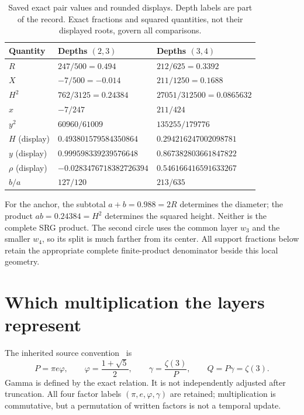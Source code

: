 \documentclass[11pt,a4paper]{article}
\begin{document}
\begin{table}[ht]
\centering\small
\begin{tabular}{@{}lll@{}}
\toprule
Quantity & Depths $(2,3)$ & Depths $(3,4)$\\
\midrule
$R$ & $247/500=0.494$ & $212/625=0.3392$\\
$X$ & $-7/500=-0.014$ & $211/1250=0.1688$\\
$H^2$ & $762/3125=0.24384$ & $27051/312500=0.0865632$\\
$x$ & $-7/247$ & $211/424$\\
$y^2$ & $60960/61009$ & $135255/179776$\\
$H$ (display) & $0.493801579584350864$ & $0.294216247002098781$\\
$y$ (display) & $0.999598339239576648$ & $0.867382803661847822$\\
$\rho$ (display) & $-0.0283476718382726394$ & $0.546166416591633267$\\
$b/a$ & $127/120$ & $213/635$\\
\bottomrule
\end{tabular}
\caption{Saved exact pair values and rounded displays. Depth labels are part of the record. Exact fractions and squared quantities, not their displayed roots, govern all comparisons.}
\label{tab:pair}
\end{table}

For the anchor, the subtotal $a+b=0.988=2R$ determines the diameter; the product $ab=0.24384=H^2$ determines the squared height. Neither is the complete SRG product. The second circle uses the common layer $w_3$ and the smaller $w_4$, so its split is much farther from its center. All support fractions below retain the appropriate complete finite-product denominator beside this local geometry.

\clearpage
\section{Which multiplication the layers represent}
\label{sec:arithmetic}
The inherited source convention~\cite{ph02,multiplication} is
\begin{equation}
P=\pi e\varphi,\qquad \varphi=\frac{1+\sqrt5}{2},\qquad
\gamma=\frac{\zeta(3)}P,\qquad Q=P\gamma=\zeta(3).
\label{eq:master}
\end{equation}
Gamma is defined by the exact relation. It is not independently adjusted after truncation. All four factor labels $(\pi,e,\varphi,\gamma)$ are retained; multiplication is commutative, but a permutation of written factors is not a temporal update.
\end{document}
